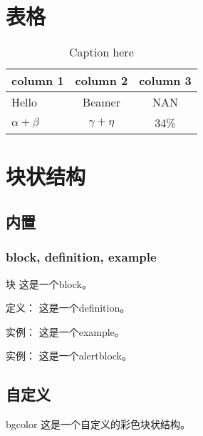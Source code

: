 \documentclass[UTF8,table]{ctexbeamer}
\begin{document}
\section{表格}
\begin{frame}
\begin{table}[tb]
	\centering
	\caption{Caption here}
	\begin{tabular}{lcc}
		\hline
		\rowcolor{blue!30}
		\textbf{column 1} & \textbf{column 2} & \textbf{column 3} \\
		\hline
		Hello & Beamer & NAN \\
		$\alpha+\beta$ & $\gamma+\eta$ & 34\% \\
		\hline
	\end{tabular}
\end{table}
\end{frame}

\section{块状结构}
\subsection{内置}
\begin{frame}
	\frametitle{block, definition, example}
	\begin{block}{块}
		这是一个block。
	\end{block}
	\pause
	\begin{definition}{定义：}
		这是一个definition。
	\end{definition}
	\pause
	\begin{example}{实例：}
		这是一个example。
	\end{example}
	\pause
	\begin{alertblock}{实例：}
		这是一个alertblock。
	\end{alertblock}
\end{frame}

\subsection{自定义}
\begin{frame}
	\begin{beamercolorbox}[rounded=true,shadow=true,wd=12cm]{bgcolor}
		这是一个自定义的彩色块状结构。
	\end{beamercolorbox}
\end{frame}
\end{document}

